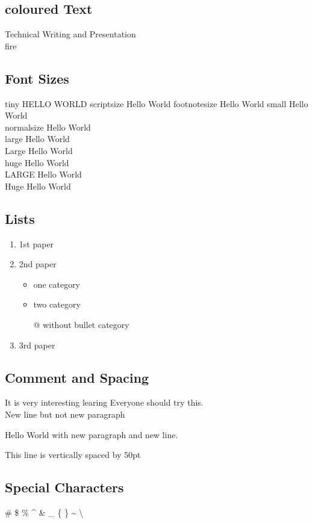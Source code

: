 \documentclass[a4paper,12pt]{article}
\begin{document}
\subsection{coloured Text}
{\color{green}Technical Writing and Presentation}\\
{\color{red}fire}

\subsection{Font Sizes}
{\tiny tiny HELLO WORLD}
{\scriptsize scriptsize Hello World}
{\footnotesize footnotesize Hello World}
{\small small Hello World}\\
{\normalsize normalsize Hello World}\\
{\large large Hello World}\\
{\Large Large Hello World}\\
{\huge huge Hello World}\\
{\LARGE LARGE Hello World}\\
{\Huge Huge Hello World }

\subsection{Lists}
\begin{enumerate}
\item 1st paper
\item 2nd paper
\begin{itemize}
\item one category
\item two category
\item[@] without bullet category
\end{itemize}
\item 3rd paper
\end{enumerate}

\subsection{Comment and Spacing}
It is very interesting learing %
Everyone should try this.\\
New line but not new paragraph

Hello         World with new paragraph and new line.

\vspace{50pt}
This line is vertically spaced by 50pt

\subsection{Special Characters}
\#
\$ 
\% 
\^{} 
\& 
\_ 
\{
\}
\~{}
\textbackslash
\end{document}
